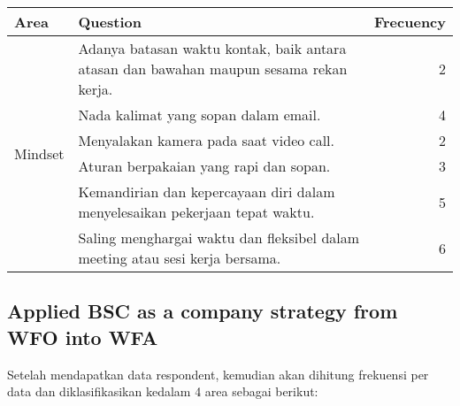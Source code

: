 \documentclass[conference]{IEEEtran}
\begin{document}
\begin{itemize}
\begin{enumerate}
\centering
{} \label{tab:title} 
\centering\begin{table}[h]
\begin{tabular}{|cl|l|r|}
\hline
\multicolumn{2}{|l|}{Area}                     & Question                                                                               & \multicolumn{1}{l|}{Frecuency} \\ \hline
\multicolumn{2}{|c|}{\multirow{6}{*}{Mindset}} & Adanya batasan waktu kontak, baik antara atasan dan bawahan maupun sesama rekan kerja. & 2                              \\ \cline{3-4} 
\multicolumn{2}{|c|}{}                         & Nada kalimat yang sopan dalam email.                                                   & 4                              \\ \cline{3-4} 
\multicolumn{2}{|c|}{}                         & Menyalakan kamera pada saat video call.                                                & 2                              \\ \cline{3-4} 
\multicolumn{2}{|c|}{}                         & Aturan berpakaian yang rapi dan sopan.                                                 & 3                              \\ \cline{3-4} 
\multicolumn{2}{|c|}{}                         & Kemandirian dan kepercayaan diri dalam menyelesaikan pekerjaan tepat waktu.            & 5                              \\ \cline{3-4} 
\multicolumn{2}{|c|}{}                         & Saling menghargai waktu dan fleksibel dalam meeting atau sesi kerja bersama.           & 6                              \\ \hline
\end{tabular}
\end{table}
\end{enumerate}
\end{itemize}






\subsection{Applied BSC as a company strategy from WFO into WFA}

Setelah mendapatkan data respondent, kemudian akan dihitung frekuensi per data dan diklasifikasikan kedalam 4 area sebagai berikut:


\centering
{} \label{tab:title} 
\end{document}
